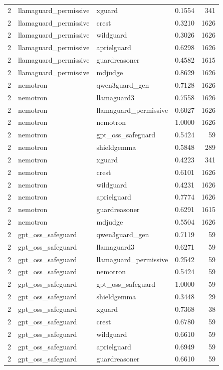 \begin{tabular}{rllrr}
2 & llamaguard\_permissive & xguard & 0.1554 & 341 \\
2 & llamaguard\_permissive & crest & 0.3210 & 1626 \\
2 & llamaguard\_permissive & wildguard & 0.3026 & 1626 \\
2 & llamaguard\_permissive & aprielguard & 0.6298 & 1626 \\
2 & llamaguard\_permissive & guardreasoner & 0.4582 & 1615 \\
2 & llamaguard\_permissive & mdjudge & 0.8629 & 1626 \\
2 & nemotron & qwen3guard\_gen & 0.7128 & 1626 \\
2 & nemotron & llamaguard3 & 0.7558 & 1626 \\
2 & nemotron & llamaguard\_permissive & 0.6027 & 1626 \\
2 & nemotron & nemotron & 1.0000 & 1626 \\
2 & nemotron & gpt\_oss\_safeguard & 0.5424 & 59 \\
2 & nemotron & shieldgemma & 0.5848 & 289 \\
2 & nemotron & xguard & 0.4223 & 341 \\
2 & nemotron & crest & 0.6101 & 1626 \\
2 & nemotron & wildguard & 0.4231 & 1626 \\
2 & nemotron & aprielguard & 0.7774 & 1626 \\
2 & nemotron & guardreasoner & 0.6291 & 1615 \\
2 & nemotron & mdjudge & 0.5504 & 1626 \\
2 & gpt\_oss\_safeguard & qwen3guard\_gen & 0.7119 & 59 \\
2 & gpt\_oss\_safeguard & llamaguard3 & 0.6271 & 59 \\
2 & gpt\_oss\_safeguard & llamaguard\_permissive & 0.2542 & 59 \\
2 & gpt\_oss\_safeguard & nemotron & 0.5424 & 59 \\
2 & gpt\_oss\_safeguard & gpt\_oss\_safeguard & 1.0000 & 59 \\
2 & gpt\_oss\_safeguard & shieldgemma & 0.3448 & 29 \\
2 & gpt\_oss\_safeguard & xguard & 0.7368 & 38 \\
2 & gpt\_oss\_safeguard & crest & 0.6780 & 59 \\
2 & gpt\_oss\_safeguard & wildguard & 0.6610 & 59 \\
2 & gpt\_oss\_safeguard & aprielguard & 0.6949 & 59 \\
2 & gpt\_oss\_safeguard & guardreasoner & 0.6610 & 59 \\

\end{tabular}
